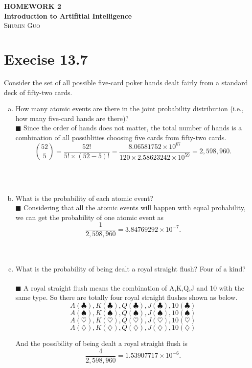 \documentclass{article}
\newcommand{\solution}[1]{~\\ $\blacksquare$ \sffamily\upshape\selectfont #1
\normalfont ~\\~ }
\begin{document}
\begin{center}
\textbf{\large{
HOMEWORK 2 \\
Introduction to Artifitial Intelligence \\}}
\textsc{\Large{Shumin Guo}}
\end{center}

\section{Execise 13.7}
Consider the set of all possible five-card poker hands dealt fairly
from a standard deck of fifty-two cards.
\begin{enumerate}[a.]
\item How many atomic events are there in the joint probability
  distribution (i.e., how many five-card hands are there)?
  \solution{Since the order of hands does not matter, the total number
  of hands is a combination of all possiblities choosing five cards
  from fifty-two cards. 
  \[ {52 \choose 5} = \frac{52!}{5!\times (52-5)!} =
  \frac{8.06581752\times 10^{67}}{120\times 2.58623242 \times 10^{59}}
  = 2,598,960. \]
} 
\item What is the probability of each atomic event?
  \solution{Considering that all the atomic events will happen with
    equal probability, we can get the probability of one atomic event
    as \[ \frac{1}{2,598,960}=3.84769292\times 10^{-7}. \]} 
\item What is the probability of being dealt a royal straight flush?
  Four of a kind? 
  \solution{A royal straight flush means the combination of A,K,Q,J
    and 10 with the same type. So there are totally four royal
    straight flushes shown as below. 
    \[ A(\clubsuit), K(\clubsuit), Q(\clubsuit), J(\clubsuit),
    10(\clubsuit) \] 
    \[ A(\spadesuit), K(\spadesuit), Q(\spadesuit), J(\spadesuit),
    10(\spadesuit) \]
    \[ A(\heartsuit), K(\heartsuit), Q(\heartsuit), J(\heartsuit),
    10(\heartsuit) \]
    \[ A(\diamondsuit), K(\diamondsuit), Q(\diamondsuit), J(\diamondsuit),
    10(\diamondsuit) \]
    
    And the possibility of being dealt a royal straight flush is 
    \[ \frac{4}{2,598,960}=1.53907717 \times 10^{-6}. \] 
  }
\end{enumerate}
\end{document}
